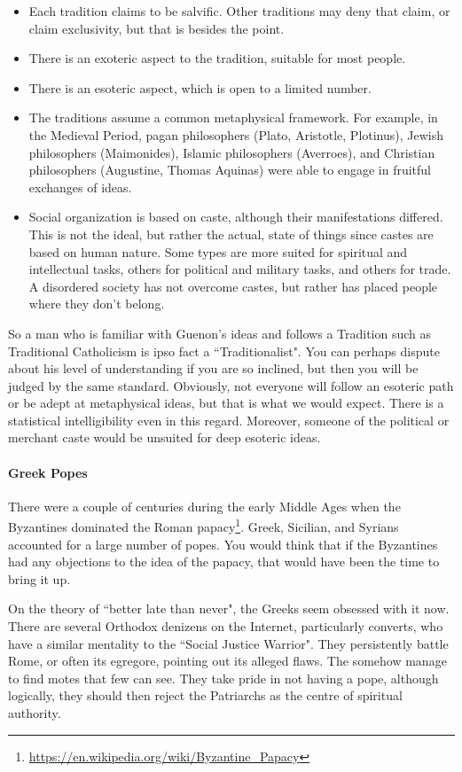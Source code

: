 \begin{itemize}
\item Each tradition claims to be salvific. Other traditions may deny that claim, or claim exclusivity, but that is besides the point. 
\item There is an exoteric aspect to the tradition, suitable for most people. 
\item There is an esoteric aspect, which is open to a limited number. 
\item The traditions assume a common metaphysical framework. For example, in the Medieval Period, pagan philosophers (Plato, Aristotle, Plotinus), Jewish philosophers (Maimonides), Islamic philosophers (Averroes), and Christian philosophers (Augustine, Thomas Aquinas) were able to engage in fruitful exchanges of ideas. 
\item Social organization is based on caste, although their manifestations differed. This is not the ideal, but rather the actual, state of things since castes are based on human nature. Some types are more suited for spiritual and intellectual tasks, others for political and military tasks, and others for trade. A disordered society has not overcome castes, but rather has placed people where they don't belong. 
\end{itemize}
So a man who is familiar with Guenon's ideas and follows a Tradition such as Traditional Catholicism is ipso fact a ``Traditionalist". You can perhaps dispute about his level of understanding if you are so inclined, but then you will be judged by the same standard. Obviously, not everyone will follow an esoteric path or be adept at metaphysical ideas, but that is what we would expect. There is a statistical intelligibility even in this regard. Moreover, someone of the political or merchant caste would be unsuited for deep esoteric ideas.

\paragraph{Greek Popes}
There were a couple of centuries during the early Middle Ages when the Byzantines dominated the Roman papacy\footnote{\url{https://en.wikipedia.org/wiki/Byzantine_Papacy}}. Greek, Sicilian, and Syrians accounted for a large number of popes. You would think that if the Byzantines had any objections to the idea of the papacy, that would have been the time to bring it up.

On the theory of ``better late than never", the Greeks seem obsessed with it now. There are several Orthodox denizens on the Internet, particularly converts, who have a similar mentality to the ``Social Justice Warrior". They persistently battle Rome, or often its egregore, pointing out its alleged flaws. The somehow manage to find motes that few can see. They take pride in not having a pope, although logically, they should then reject the Patriarchs as the centre of spiritual authority.

